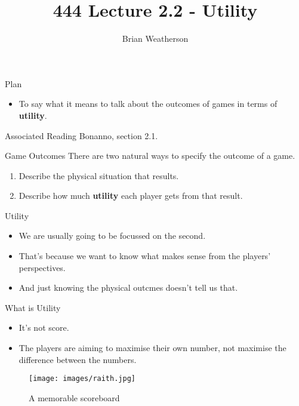 \documentclass[
  ignorenonframetext,
]{beamer}
\title{444 Lecture 2.2 - Utility}
\author{Brian Weatherson}
\date{}
\providecommand{\tightlist}{%
  \setlength{\itemsep}{0pt}\setlength{\parskip}{0pt}}
\begin{document}
\frame{\titlepage}

\begin{frame}{Plan}
\protect\hypertarget{plan}{}
\begin{itemize}
\tightlist
\item
  To say what it means to talk about the outcomes of games in terms of
  \textbf{utility}.
\end{itemize}
\end{frame}

\begin{frame}{Associated Reading}
\protect\hypertarget{associated-reading}{}
Bonanno, section 2.1.
\end{frame}

\begin{frame}{Game Outcomes}
\protect\hypertarget{game-outcomes}{}
There are two natural ways to specify the outcome of a game.

\begin{enumerate}[<+->]
\tightlist
\item
  Describe the physical situation that results.
\item
  Describe how much \textbf{utility} each player gets from that result.
\end{enumerate}
\end{frame}

\begin{frame}{Utility}
\protect\hypertarget{utility}{}
\begin{itemize}
\tightlist
\item
  We are usually going to be focussed on the second.
\item
  That's because we want to know what makes sense from the players'
  perspectives.
\item
  And just knowing the physical outcmes doesn't tell us that.
\end{itemize}
\end{frame}

\begin{frame}{What is Utility}
\protect\hypertarget{what-is-utility}{}
\begin{itemize}
\tightlist
\item
  It's not score.
\item
  The players are aiming to maximise their own number, not maximise the
  difference between the numbers.
\end{itemize}
\end{frame}

\begin{frame}
\begin{figure}
\centering
\texttt{[image: images/raith.jpg]}
\caption{A memorable scoreboard}
\end{figure}
\end{frame}
\end{document}
